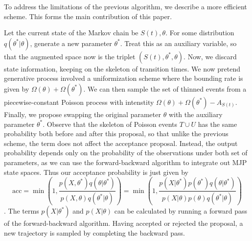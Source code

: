 To address the limitations of the previous algorithm, we describe
a more efficient scheme. This forms the main contribution of this paper.

Let the current state of the Markov chain be $S(t), \theta$. For some
distribution $q(\theta^*|\theta)$, generate a new parameter
$\theta^*$. Treat this as an auxiliary variable, so that the augmented
space now is the triplet $(S(t), \theta^*,\theta)$. Now, we discard
state information, keeping on the skeleton of transition times.
We now pretend generative process involved a uniformization scheme
where the bounding rate is given by $\Omega(\theta) + \Omega(\theta^*)$.
We can then sample the set of thinned events from a piecewise-constant
Poisson process with intenstity $\Omega(\theta) + \Omega(\theta^*) - 
A_{S(t)}$. Finally, we propose swapping the original parameter
$\theta$ with the auxiliary parameter $\theta^*$. Observe that the
skeleton of Poisson events $T \cup U$ has the same probability both
before and after this proposal, so that unlike the previous scheme,
the term does not affect the acceptance proposal. Instead, the output
probability depends only on the probability of the observations
under both set of parameters, as we can use the forward-backward algorithm
to integrate out MJP state spaces. Thus our acceptance probability is
just given by
$$ \text{acc} = 
  \min\left(1, \frac{p(X,\theta^*)q(\theta|\theta^*)}
   {p(X,\theta)q(\theta^*|\theta)}\right) = 
  \min\left(1, \frac{p(X|\theta^*)p(\theta^*)q(\theta|\theta^*)}
   {p(X|\theta)p(\theta)q(\theta^*|\theta)}\right)
   $$.
   The terms $p(X|\theta^*)$ and  $p(X|\theta)$ can be calculated by 
   running a forward pass of the forward-backward algorithm. Having
   accepted or rejected the proposal, a new trajectory is sampled by
   completing the backward pass.
